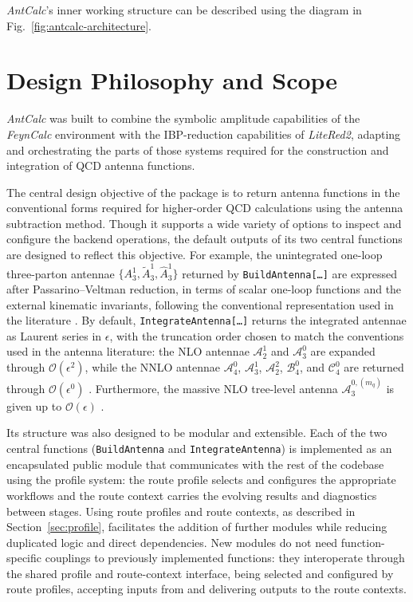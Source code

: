 \textit{AntCalc}'s inner working structure can be described using the diagram in Fig.~\ref{fig:antcalc-architecture}.



\section{Design Philosophy and Scope}\label{sec:philosophy}

\textit{AntCalc} was built to combine the symbolic amplitude capabilities of the 
\textit{FeynCalc} environment with the IBP-reduction capabilities of \textit{LiteRed2}, adapting and 
orchestrating the parts of those systems required for the construction and integration
of QCD antenna functions. 

The central design objective of the package is to return antenna functions in the
conventional forms required for higher-order QCD calculations using the antenna
subtraction method.
Though it supports a wide
variety of options to inspect and configure the backend operations, the default outputs
of its two central functions are designed to reflect this objective.
For example, the unintegrated one-loop three-parton antennae $\{A_3^1, \tilde A_3^1, \hat A_3^1\}$ returned by
\texttt{BuildAntenna[\ldots]} are expressed after Passarino--Veltman reduction, in terms of
scalar one-loop functions and the external kinematic invariants, following the conventional
representation used in the literature \cite{Gehrmann-DeRidder:2005btv}. By default, \texttt{IntegrateAntenna[\ldots]} returns
the integrated antennae as Laurent series in $\epsilon$, with the truncation order chosen to
match the conventions used in the antenna literature: the NLO antennae $\mathcal A_2^1$ and
$\mathcal A_3^0$ are expanded through $\mathcal O(\epsilon^2)$, while the NNLO antennae
$\mathcal A_4^0$, $\mathcal A_3^1$, $\mathcal A_2^2$, $\mathcal B_4^0$, and $\mathcal C_4^0$ are
returned through $\mathcal O(\epsilon^0)$ \cite{Gehrmann-DeRidder:2005btv,Gehrmann-DeRidder:2004ttg}.
Furthermore, the massive NLO tree-level antenna $\mathcal A_3^{0,(m_q)}$ is given up to
$\mathcal O(\epsilon)$ \cite{GehrmannDeRidder:2009fz}.

Its structure was also designed to be modular and extensible.
Each of the two central functions (\texttt{BuildAntenna} and \texttt{IntegrateAntenna}) is 
implemented as an encapsulated public module that communicates with the rest of the codebase
using the profile system: the route profile selects and configures the appropriate 
workflows and the route context carries the evolving results and diagnostics between 
stages.
Using route profiles and route contexts, as described in Section~\ref{sec:profile},
facilitates the addition of further modules while reducing duplicated logic and
direct dependencies. New modules do not need function-specific couplings to previously implemented functions: they interoperate through the shared profile and route-context interface, being selected and configured by route profiles, accepting inputs from and delivering outputs to the route contexts. 

